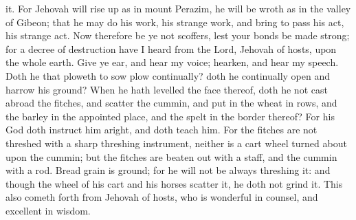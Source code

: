 it. For Jehovah will rise up as in mount Perazim, he will be wroth as in the valley of Gibeon; that he may do his work, his strange work, and bring to pass his act, his strange act. Now therefore be ye not scoffers, lest your bonds be made strong; for a decree of destruction have I heard from the Lord, Jehovah of hosts, upon the whole earth.  Give ye ear, and hear my voice; hearken, and hear my speech. Doth he that ploweth to sow plow continually? doth he continually open and harrow his ground? When he hath levelled the face thereof, doth he not cast abroad the fitches, and scatter the cummin, and put in the wheat in rows, and the barley in the appointed place, and the spelt in the border thereof? For his God doth instruct him aright, and doth teach him. For the fitches are not threshed with a sharp threshing instrument, neither is a cart wheel turned about upon the cummin; but the fitches are beaten out with a staff, and the cummin with a rod. Bread grain is ground; for he will not be always threshing it: and though the wheel of his cart and his horses scatter it, he doth not grind it. This also cometh forth from Jehovah of hosts, who is wonderful in counsel, and excellent in wisdom. 


